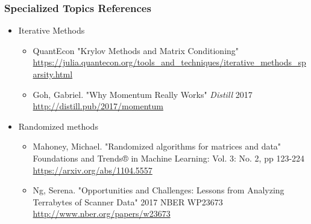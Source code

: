 \documentclass[bigger]{beamer}
\begin{document}
\begin{frame}
\frametitle{Specialized Topics References}

\begin{itemize}

\item Iterative Methods
\begin{itemize}
\item QuantEcon "Krylov Methods and Matrix Conditioning" \url{https://julia.quantecon.org/tools_and_techniques/iterative_methods_sparsity.html}
\item Goh, Gabriel. "Why Momentum Really Works" \emph{Distill} 2017 \url{http://distill.pub/2017/momentum}
\end{itemize}


\item Randomized methods
\begin{itemize}
\item Mahoney, Michael. "Randomized algorithms for matrices and data" Foundations and Trends® in Machine Learning: Vol. 3: No. 2, pp 123-224 \url{https://arxiv.org/abs/1104.5557}
\item Ng, Serena. "Opportunities and Challenges: Lessons from Analyzing Terrabytes of Scanner Data" 2017 NBER WP23673 \url{http://www.nber.org/papers/w23673}
\end{itemize}

\end{itemize}

\end{frame} 
\end{document}
